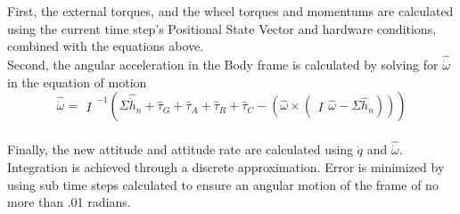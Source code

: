 \documentclass[12pt,letterpaper]{paper}
\begin{document}
First, the external torques, and the wheel torques and momentums are calculated using the current time step's Positional State Vector and hardware conditions, combined with the equations above.
\\

Second, the angular acceleration in the Body frame is calculated by solving for $\hat{\dot{\omega}}$ in the equation of motion
\[\hat{\dot{\omega}} = \begin{matrix}I\end{matrix}^{-1}\left(\Sigma\hat{\dot{h}}_{n} + \hat{\tau}_{G} + \hat{\tau}_{A} + \hat{\tau}_{R} + \hat{\tau}_{C} - (\hat{\omega} \times ( \begin{matrix}I\end{matrix} \hat{\omega} - \Sigma\hat{h}_{n}))\right)\]
\\

Finally, the new attitude and attitude rate are calculated using $\dot{q}$ and $\hat{\dot{\omega}}$. Integration is achieved through a discrete approximation. Error is minimized by using sub time steps calculated to ensure an angular motion of the frame of no more than .01 radians.



%


\end{document}
